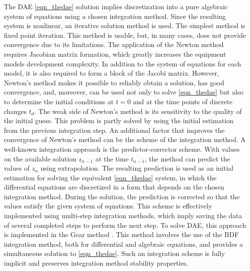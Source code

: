 \documentclass[lettersize,journal]{IEEEtran}
\begin{document}
The DAE \eqref{eqn_thedae} solution implies discretization into a pure algebraic system of equations using a chosen integration method. Since the resulting system is nonlinear, an iterative solution method is used. The simplest method is fixed point iteration. This method is usable, but, in many cases, does not provide convergence due to its limitations. The application of the Newton method requires Jacobian matrix formation, which greatly increases the equipment models development complexity. In addition to the system of equations for each model, it is also required to form a block of the Jacobi matrix. However, Newton's method makes it possible to reliably obtain a solution, has good convergence, and, moreover, can be used not only to solve \eqref{eqn_thedae} but also to determine the initial conditions at \(t=0\) and at the time points of discrete changes \(t_d\). The weak side of Newton's method is its sensitivity to the quality of the initial guess. This problem is partly solved by using the initial estimation from the previous integration step. An additional factor that improves the convergence of Newton's method can be the scheme of the integration method. A well-known integration approach is the predictor-corrector scheme. With values on the available solution \(z_{n-1}\) at the time \(t_{n-1}\), the method can predict the values of \(z_n\) using extrapolation. The resulting prediction is used as an initial estimation for solving the equivalent \eqref{eqn_thedae} system, in which the differential equations are discretized in a form that depends on the chosen integration method. During the solution, the prediction is corrected so that the values satisfy the given system of equations. This scheme is effectively implemented using multi-step integration methods, which imply saving the data of several completed steps to perform the next step. To solve DAE, this approach is implemented in the Gear method \cite{gear71}. This method involves the use of the BDF integration method, both for differential and algebraic equations, and provides a simultaneous solution to \eqref{eqn_thedae}. Such an integration scheme is fully implicit and preserves integration method stability properties.
\end{document}
